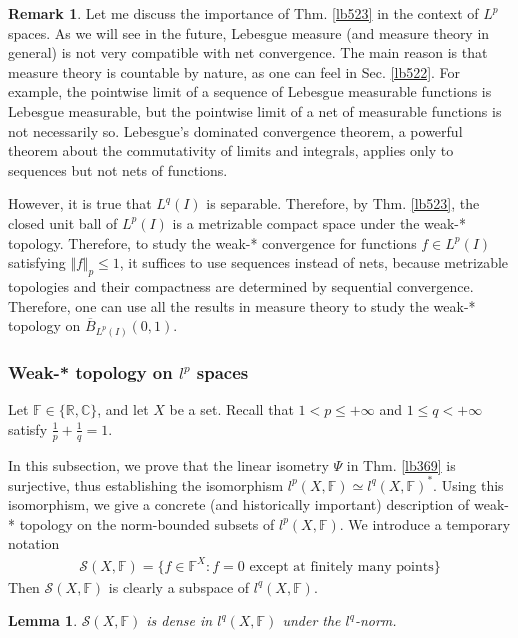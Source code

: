 \documentclass[12pt,b5paper,notitlepage]{article}
\theoremstyle{definition}
\newtheorem{rem}[df]{Remark}
\theoremstyle{plain}
\newtheorem{lm}[df]{Lemma}
\newcommand{\mc}{\mathcal}
\newcommand{\ovl}{\overline}
\newcommand{\Cbb}{\mathbb C}
\newcommand{\Rbb}{\mathbb R}
\newcommand{\Fbb}{\mathbb F}
\numberwithin{equation}{section}
\begin{document}
\begin{rem}\label{lb569}
Let me discuss the importance of Thm. \ref{lb523} in the context of $L^p$ spaces. As we will see in the future, Lebesgue measure (and measure theory in general) is not very compatible with net convergence. The main reason is that measure theory is countable by nature, as one can feel in Sec. \ref{lb522}. For example, the pointwise limit of a sequence of Lebesgue measurable functions is Lebesgue measurable, but the pointwise limit of a net of measurable functions is not necessarily so. Lebesgue's dominated convergence theorem, a powerful theorem about the commutativity of limits and integrals, applies only to sequences but not nets of functions. 

However, it is true that $L^q(I)$ is separable. Therefore, by Thm. \ref{lb523}, the closed unit ball of $L^p(I)$ is a metrizable compact space under the weak-* topology. Therefore, to study the weak-* convergence for functions $f\in L^p(I)$ satisfying $\Vert f\Vert_p\leq 1$, it suffices to use sequences instead of nets, because metrizable topologies and their compactness are determined by sequential convergence. Therefore, one can use all the results in measure theory to study the weak-* topology on $\ovl B_{L^p(I)}(0,1)$.  \hfill\qedsymbol
\end{rem}

\subsubsection{Weak-* topology on $l^p$ spaces}

Let $\Fbb\in\{\Rbb,\Cbb\}$, and let $X$ be a set. Recall that $1<p\leq +\infty$ and $1\leq q<+\infty$ satisfy $\frac 1p+\frac 1q=1$. 

In this subsection, we prove that the linear isometry $\Psi$ in Thm. \ref{lb369} is surjective, thus establishing the isomorphism $l^p(X,\Fbb)\simeq l^q(X,\Fbb)^*$. Using this isomorphism, we give a concrete (and historically important) description of weak-* topology on the norm-bounded subsets of $l^p(X,\Fbb)$. We introduce a temporary notation
\begin{align}
\mc S(X,\Fbb)=\{f\in\Fbb^X:f=0\text{ except at finitely many points}\}
\end{align}
Then $\mc S(X,\Fbb)$ is clearly a subspace of $l^q(X,\Fbb)$.


\begin{lm}\label{lb528}
$\mc S(X,\Fbb)$ is dense in $l^q(X,\Fbb)$ under the $l^q$-norm.
\end{lm}
\end{document}
